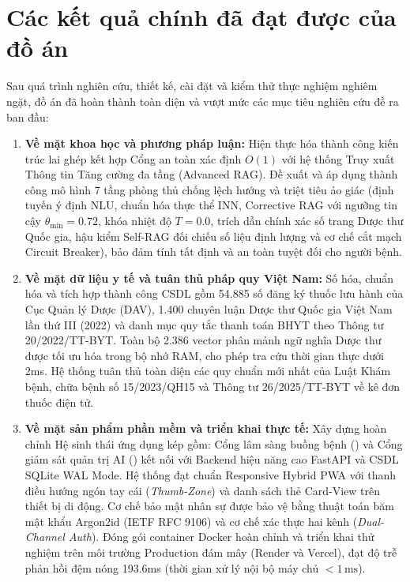 \section{Các kết quả chính đã đạt được của đồ án}
\label{sec:conclusions}

Sau quá trình nghiên cứu, thiết kế, cài đặt và kiểm thử thực nghiệm nghiêm ngặt, đồ án đã hoàn thành toàn diện và vượt mức các mục tiêu nghiên cứu đề ra ban đầu:

\begin{enumerate}[leftmargin=1.5em]
    \item \textbf{Về mặt khoa học và phương pháp luận:}
    Hiện thực hóa thành công kiến trúc lai ghép kết hợp Cổng an toàn xác định $O(1)$ với hệ thống Truy xuất Thông tin Tăng cường đa tầng (Advanced RAG). Đề xuất và áp dụng thành công mô hình 7 tầng phòng thủ chống lệch hướng và triệt tiêu ảo giác (định tuyến ý định NLU, chuẩn hóa thực thể INN, Corrective RAG với ngưỡng tin cậy $\theta_{\text{min}} = 0.72$, khóa nhiệt độ $T = 0.0$, trích dẫn chính xác số trang Dược thư Quốc gia, hậu kiểm Self-RAG đối chiếu số liệu định lượng và cơ chế cắt mạch Circuit Breaker), bảo đảm tính tất định và an toàn tuyệt đối cho người bệnh.
    
    \item \textbf{Về mặt dữ liệu y tế và tuân thủ pháp quy Việt Nam:}
    Số hóa, chuẩn hóa và tích hợp thành công CSDL gồm 54.885 số đăng ký thuốc lưu hành của Cục Quản lý Dược (DAV), 1.400 chuyên luận Dược thư Quốc gia Việt Nam lần thứ III (2022) và danh mục quy tắc thanh toán BHYT theo Thông tư 20/2022/TT-BYT. Toàn bộ 2.386 vector phân mảnh ngữ nghĩa Dược thư được tối ưu hóa trong bộ nhớ RAM, cho phép tra cứu thời gian thực dưới 2ms. Hệ thống tuân thủ toàn diện các quy chuẩn mới nhất của Luật Khám bệnh, chữa bệnh số 15/2023/QH15 và Thông tư 26/2025/TT-BYT về kê đơn thuốc điện tử.
    
    \item \textbf{Về mặt sản phẩm phần mềm và triển khai thực tế:}
    Xây dựng hoàn chỉnh Hệ sinh thái ứng dụng kép gồm: Cổng lâm sàng buồng bệnh () và Cổng giám sát quản trị AI () kết nối với Backend hiệu năng cao FastAPI và CSDL SQLite WAL Mode. Hệ thống đạt chuẩn Responsive Hybrid PWA với thanh điều hướng ngón tay cái (\textit{Thumb-Zone}) và danh sách thẻ Card-View trên thiết bị di động. Cơ chế bảo mật nhân sự được bảo vệ bằng thuật toán băm mật khẩu Argon2id (IETF RFC 9106) và cơ chế xác thực hai kênh (\textit{Dual-Channel Auth}). Đóng gói container Docker hoàn chỉnh và triển khai thử nghiệm trên môi trường Production đám mây (Render và Vercel), đạt độ trễ phản hồi đệm nóng 193.6ms (thời gian xử lý nội bộ máy chủ $< 1\,\text{ms}$).
\end{enumerate}
